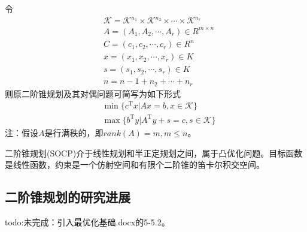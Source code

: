         \par
        令
        \begin{align*}
          & \mathcal{K}=\mathcal{K}^{n_1}\times \mathcal{K}^{n_2}\times\cdots \times \mathcal{K}^{n_r}\\
          & A=(A_1,A_2,\cdots,A_r)\in R^{m\times n}\\
          & C=(c_1,c_2,\cdots,c_r)\in R^ n \\
          & x=(x_1,x_2,\cdots,x_r)\in K\\
          & s=(s_1,s_2,\cdots,s_r)\in K\\
          & n=n-1+n_2+\cdots+n_r
        \end{align*}
        则原二阶锥规划及其对偶问题可简写为如下形式
        \begin{align*}
          & \mathop{\min}\{c^\mathrm{T} x|Ax=b,x \in \mathcal{K}\}\\
          & \mathop{\max}\{b^\mathrm{T} y|A^\mathrm{T} y+s=c,s \in \mathcal{K}\}
        \end{align*}
        注：假设$A$是行满秩的，即$rank(A)=m,m \leqslant n$。
        \par
        二阶锥规划(SOCP)介于线性规划和半正定规划之间，属于凸优化问题。目标函数是线性函数，约束是一个仿射空间和有限个二阶锥的笛卡尔积交空间。
    \subsection{二阶锥规划的研究进展}
        todo:未完成：引入最优化基础.docx的5-5.2。
